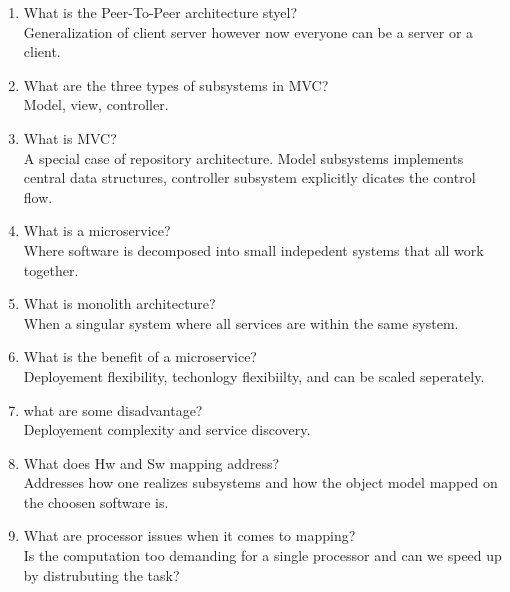 \documentclass[10pt]{article}
\begin{document}
\begin{enumerate}
      \item What is the Peer-To-Peer architecture styel?\\
            Generalization of client server however now everyone can be a server or a client.\\


      \item What are the three types of subsystems in MVC?\\
            Model, view, controller.\\

      \item What is MVC?\\
            A special case of repository architecture. Model subsystems implements central data structures, controller subsystem explicitly dicates the control flow.\\

      \item What is a microservice?\\
            Where software is decomposed into small indepedent systems that all work together.\\

      \item What is monolith architecture?\\
            When a singular system where all services are within the same system.\\

      \item What is the benefit of a microservice?\\
            Deployement flexibility, techonlogy flexibiilty, and can be scaled seperately.\\

      \item what are some disadvantage?\\
            Deployement complexity and service discovery.\\

      \item What does Hw and Sw mapping address?\\
            Addresses how one realizes subsystems and how the object model mapped on the choosen software is.\\


      \item What are processor issues when it comes to mapping?\\
            Is the computation too demanding for a single processor and can we speed up by distrubuting the task?\\


\end{enumerate}
\end{document}
